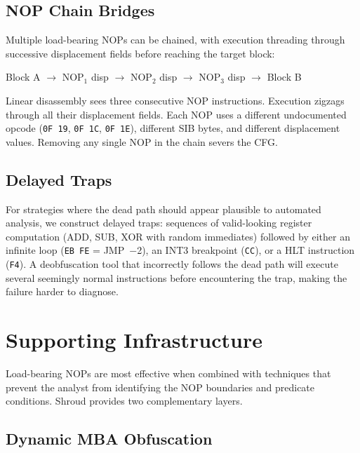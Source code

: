 \documentclass[letterpaper,twocolumn,10pt]{article}
\begin{document}
\subsection{NOP Chain Bridges}

Multiple load-bearing NOPs can be chained, with execution threading through successive displacement fields before reaching the target block:

\begin{center}
Block A $\rightarrow$ NOP$_1$ disp $\rightarrow$ NOP$_2$ disp $\rightarrow$ NOP$_3$ disp $\rightarrow$ Block B
\end{center}

Linear disassembly sees three consecutive NOP instructions. Execution zigzags through all their displacement fields. Each NOP uses a different undocumented opcode (\texttt{0F~19}, \texttt{0F~1C}, \texttt{0F~1E}), different SIB bytes, and different displacement values. Removing any single NOP in the chain severs the CFG.

\subsection{Delayed Traps}

For strategies where the dead path should appear plausible to automated analysis, we construct delayed traps: sequences of valid-looking register computation (ADD, SUB, XOR with random immediates) followed by either an infinite loop (\texttt{EB~FE} = JMP~$-$2), an INT3 breakpoint (\texttt{CC}), or a HLT instruction (\texttt{F4}). A deobfuscation tool that incorrectly follows the dead path will execute several seemingly normal instructions before encountering the trap, making the failure harder to diagnose.

\section{Supporting Infrastructure}
\label{sec:infra}

Load-bearing NOPs are most effective when combined with techniques that prevent the analyst from identifying the NOP boundaries and predicate conditions. Shroud provides two complementary layers.

\subsection{Dynamic MBA Obfuscation}
\end{document}
